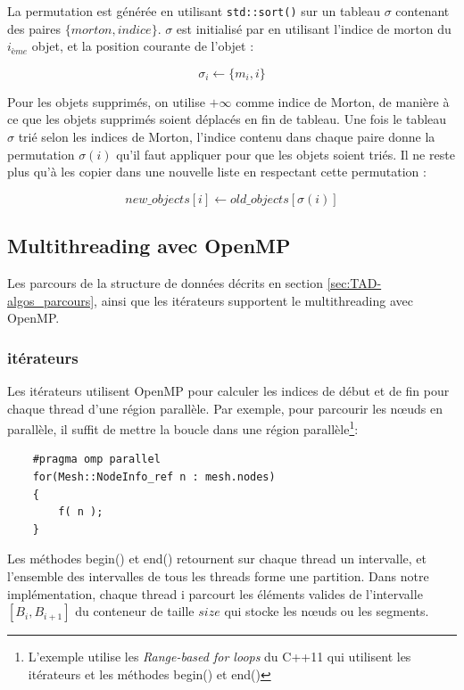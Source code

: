 La permutation est générée en utilisant \verb|std::sort()| sur un tableau $\sigma$ contenant des paires $\{morton, indice\}$. $\sigma$ est initialisé par en utilisant l'indice de morton du $i_{ème}$ objet, et la position courante de l'objet : 

\begin{equation}
\sigma_i \leftarrow \{m_i, i\}
\end{equation}

Pour les objets supprimés, on utilise $+\infty$ comme indice de Morton, de manière à ce que les objets supprimés soient déplacés en fin de tableau. Une fois le tableau $\sigma$ trié selon les indices de Morton, l'indice contenu dans chaque paire donne la permutation $\sigma(i)$ qu'il faut appliquer pour que les objets soient triés. Il ne reste plus qu'à les copier dans une nouvelle liste en respectant cette permutation :

\begin{equation}
new\_objects[i] \leftarrow old\_objects[\sigma(i)]
\end{equation}




\subsection{Multithreading avec OpenMP}

Les parcours de la structure de données décrits en section \ref{sec:TAD-algos_parcours}, ainsi que les itérateurs supportent le multithreading avec OpenMP. 

\subsubsection{itérateurs}

Les itérateurs utilisent OpenMP pour calculer les indices de début et de fin pour chaque thread d'une région parallèle. Par exemple, pour parcourir les nœuds en parallèle, il suffit de mettre la boucle dans une région parallèle\footnote{L'exemple utilise les \textit{Range-based for loops} du C++11 qui utilisent les itérateurs et les méthodes begin() et end()}:

\begin{verbatim}
    #pragma omp parallel
    for(Mesh::NodeInfo_ref n : mesh.nodes)
    {
        f( n );
    }
\end{verbatim}

Les méthodes begin() et end() retournent sur chaque thread un intervalle, et l'ensemble des intervalles de tous les threads forme une partition. Dans notre implémentation, chaque thread i parcourt les éléments valides de l'intervalle $[B_i, B_{i+1}]$ du conteneur de taille $size$ qui stocke les nœuds ou les segments.

